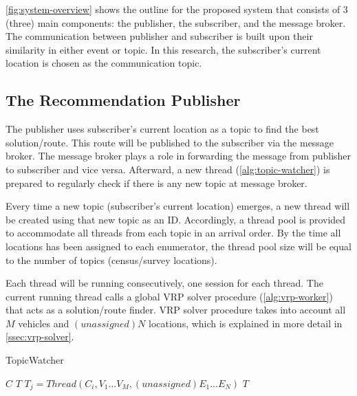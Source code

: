 \documentclass[conference]{IEEEtran}
\begin{document}
\autoref{fig:system-overview} shows the outline for the proposed system that consists of 3 (three) main components: the publisher, the subscriber, and the message broker. The communication between publisher and subscriber is built upon their similarity in either event or topic. In this research, the subscriber's current location is chosen as the communication topic. 


\subsection{The Recommendation Publisher}
\label{ssec:recommendation-publisher}
The publisher uses subscriber's current location as a topic to find the best solution/route. This route will be published to the subscriber via the message broker. The message broker plays a role in forwarding the message from publisher to subscriber and vice versa. Afterward, a new thread (\autoref{alg:topic-watcher}) is prepared to regularly check if there is any new topic at message broker. 

Every time a new topic (subscriber’s current location) emerges, a new thread will be created using that new topic as an ID. Accordingly, a thread pool is provided to accommodate all threads from each topic in an arrival order. By the time all locations has been assigned to each enumerator, the thread pool size will be equal to the number of topics (census/survey locations). 

Each thread will be running consecutively, one session for each thread. The current running thread calls a global VRP solver procedure (\autoref{alg:vrp-worker}) that acts as a solution/route finder. VRP solver procedure takes into account all $M$ vehicles and $(unassigned) N$ locations, which is explained in more detail in \autoref{ssec:vrp-solver}.


\begin{algorithm}[!]
	\caption{TopicWatcher}
	\label{alg:topic-watcher}
	\begin{algorithmic}[1]
		\renewcommand{\algorithmicrequire}{\textbf{Input:}}
		\renewcommand{\algorithmicensure}{\textbf{Output:}}
		\REQUIRE $C$
		\ENSURE  $T$
					\STATE $T_j = Thread(C_i, V_1...V_M, (unassigned) E_1...E_N)$
				\ENDIF
			\ENDFOR
		\ENDFOR
		\RETURN $T$
	\end{algorithmic}
\end{algorithm}
\end{document}
